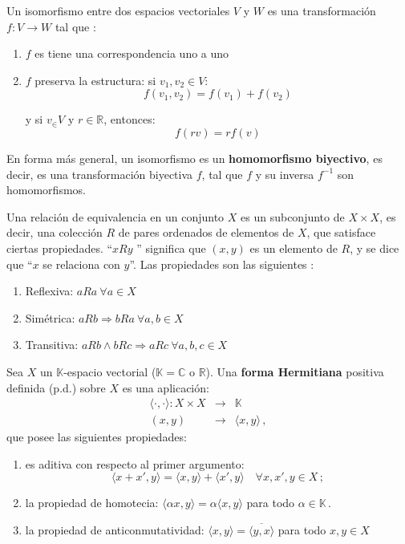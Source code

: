 \begin{mydef}
Un isomorfismo entre dos espacios vectoriales $V$ y $W$ es una transformaci\'on  $f:V \rightarrow W$ tal que \cite{wikibooksIsom}:

\begin{enumerate}
\item $f$ es tiene una correspondencia uno a uno
\item $f$ preserva la estructura: si $v_1, v_2 \in V$:
$$f(v_1, v_2) = f(v_1) + f(v_2)$$

y si $v_ \in V$ y $r \in \mathbb{R}$, entonces:
$$f(rv)= r f(v)$$

\end{enumerate}

En forma m\'as general, un isomorfismo es un \textbf{homomorfismo biyectivo},
es decir, es una transformaci\'on biyectiva $f$, tal que $f$ y su inversa
$f^{-1}$ son homomorfismos.

\end{mydef}


\begin{mydef}
Una relaci\'on de equivalencia en un conjunto $X$ es un subconjunto de $X\times
X$, es decir, una colecci\'on $R$ de pares ordenados de elementos de $X$, que
satisface ciertas propiedades.
``$x R y$ '' significa que $(x,y)$ es un elemento de $R$, y se dice que ``$x$
se relaciona con $y$''.
Las propiedades son las siguientes \cite{wolframREq}:

\begin{enumerate}
\item Reflexiva: $a R a \ \forall a \in X$

\item Sim\'etrica: $a R b \Rightarrow b R a \ \forall a,b \in X$

\item Transitiva: $a R b \wedge b R c \Rightarrow a R c \ \forall a,b,c \in X$
\end{enumerate} 
\end{mydef}

\begin{mydef}
Sea $X$ un $\mathbb{K}$-espacio vectorial
{\rm ($\mathbb{K}=\mathbb{C}$ o $\mathbb{R}$)}. 
Una \textbf{forma Hermitiana} positiva definida (p.d.) sobre $X$
es una aplicaci\'on:
\begin{eqnarray*}
\langle\cdot,\cdot\rangle: X\times X & \rightarrow & \mathbb{K} \\
(x,y) & \rightarrow & \langle x,y \rangle\,,
\end{eqnarray*}
que posee las siguientes propiedades:
\begin{enumerate}
\item
es aditiva con respecto al primer argumento:
$$
\langle x+x',y \rangle = \langle x,y \rangle + \langle x',y \rangle
\quad \forall x,x',y \in X\,;
$$
\item
la propiedad de homotecia:
$\langle\alpha x,y\rangle = \alpha\langle x,y\rangle$ 
para todo $\alpha\in\mathbb{K}$\,.
\item
la propiedad de anticonmutatividad:
$\langle x,y\rangle=\overline{\langle y,x\rangle}$
para todo $x,y\in X$
\end{enumerate}
\end{mydef}

